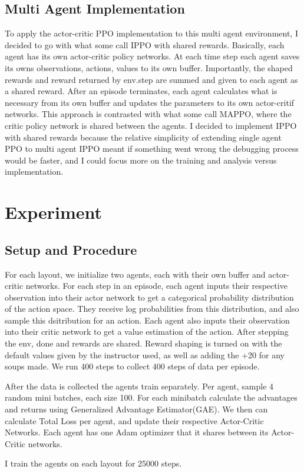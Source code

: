 \documentclass[conference]{IEEEtran}
\begin{document}
\subsection{Multi Agent Implementation}
To apply the actor-critic PPO implementation to this multi agent environment, I decided to go with what some call IPPO with shared rewards. 
Basically, each agent has its own actor-critic policy networks. At each time step each agent saves its owns observations, actions, values to its
own buffer. Importantly, the shaped rewards and reward returned by env.step are summed and given to each agent as a shared reward. After an episode
terminates, each agent calculates what is necessary from its own buffer and updates the parameters to its own actor-critif networks. This approach is
contrasted with what some call MAPPO, where the critic policy network is shared between the agents. I decided to implement IPPO with shared rewards 
because the relative simplicity of extending single agent PPO to multi agent IPPO meant if something went wrong the debugging process would be 
faster, and I could focus more on the training and analysis versus implementation. 

\section{Experiment}

\subsection{Setup and Procedure}
For each layout, we initialize two agents, each with their own buffer and actor-critic networks. For each step in an episode, each agent
inputs their respective observation into their actor network to get a categorical probability distribution of the action space. They receive log probabilities
from this distribution, and also sample this dsitribution for an action. Each agent also inputs their observation into their critic network to get 
a value estimation of the action. After stepping the env, done and rewards are shared. Reward shaping is turned on with the default values given 
by the instructor used, as well as adding the +20 for any soups made. We run 400 steps to collect 400 steps of data per episode. \par
After the data is collected the agents train separately. Per agent, sample 4 random mini batches, each size 100. For each minibatch calculate the advantages and returns using 
Generalized Advantage Estimator(GAE). We then can calculate Total Loss per agent, and update their respective Actor-Critic Networks. Each agent has 
one Adam optimizer that it shares between its Actor-Critic networks. \par
I train the agents on each layout for 25000 steps. 
\end{document}
